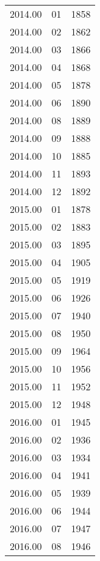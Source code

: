 \begin{tabular}{rlr}
  2014.00 & 01 & 1858 \\ 
  2014.00 & 02 & 1862 \\ 
  2014.00 & 03 & 1866 \\ 
  2014.00 & 04 & 1868 \\ 
  2014.00 & 05 & 1878 \\ 
  2014.00 & 06 & 1890 \\ 
  2014.00 & 08 & 1889 \\ 
  2014.00 & 09 & 1888 \\ 
  2014.00 & 10 & 1885 \\ 
  2014.00 & 11 & 1893 \\ 
  2014.00 & 12 & 1892 \\ 
  2015.00 & 01 & 1878 \\ 
  2015.00 & 02 & 1883 \\ 
  2015.00 & 03 & 1895 \\ 
  2015.00 & 04 & 1905 \\ 
  2015.00 & 05 & 1919 \\ 
  2015.00 & 06 & 1926 \\ 
  2015.00 & 07 & 1940 \\ 
  2015.00 & 08 & 1950 \\ 
  2015.00 & 09 & 1964 \\ 
  2015.00 & 10 & 1956 \\ 
  2015.00 & 11 & 1952 \\ 
  2015.00 & 12 & 1948 \\ 
  2016.00 & 01 & 1945 \\ 
  2016.00 & 02 & 1936 \\ 
  2016.00 & 03 & 1934 \\ 
  2016.00 & 04 & 1941 \\ 
  2016.00 & 05 & 1939 \\ 
  2016.00 & 06 & 1944 \\ 
  2016.00 & 07 & 1947 \\ 
  2016.00 & 08 & 1946 \\ 
   \hline
\end{tabular}
